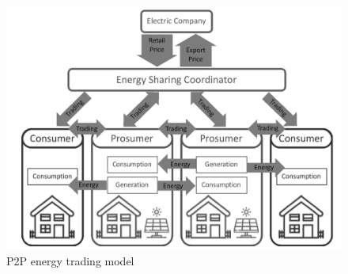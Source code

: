 \begin{figure}[h!]
    \centering
    \includegraphics[scale=0.4]{Figures/P2P_Energy_Trading_Model.png}
    \caption{P2P energy trading model \cite{Soto2021}}
\end{figure}


